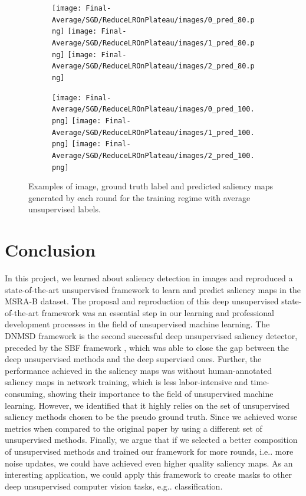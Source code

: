 \documentclass{article}
\makeatletter
\DeclareRobustCommand\onedot{\futurelet\@let@token\@onedot}
\def\@onedot{\ifx\@let@token.\else.\null\fi\xspace}
\def\eg{e.g\onedot} \def\Eg{E.g\onedot}
\def\ie{i.e\onedot} \def\Ie{I.e\onedot}
\makeatother
\begin{document}
\begin{figure}[h]
\begin{subfigure}[c]{0.12\textwidth}
  \end{subfigure}
  \begin{subfigure}[c]{0.12\textwidth}
    \centering
      \texttt{[image: Final-Average/SGD/ReduceLROnPlateau/images/0\_pred\_80.png]}
      \texttt{[image: Final-Average/SGD/ReduceLROnPlateau/images/1\_pred\_80.png]}
      \texttt{[image: Final-Average/SGD/ReduceLROnPlateau/images/2\_pred\_80.png]}
  \end{subfigure}
  \begin{subfigure}[c]{0.12\textwidth}
    \centering
      \texttt{[image: Final-Average/SGD/ReduceLROnPlateau/images/0\_pred\_100.png]}
      \texttt{[image: Final-Average/SGD/ReduceLROnPlateau/images/1\_pred\_100.png]}
      \texttt{[image: Final-Average/SGD/ReduceLROnPlateau/images/2\_pred\_100.png]}
  \end{subfigure}
  \caption{Examples of image, ground truth label and predicted saliency maps generated by each round for the training regime with average unsupervised labels.}
  \label{fig:av_ablation_sm}
\end{figure}

\section{Conclusion}

In this project, we learned about saliency detection in images and reproduced a state-of-the-art unsupervised framework to learn and predict saliency maps in the MSRA-B dataset. The proposal and reproduction of this deep unsupervised state-of-the-art framework was an essential step in our learning and professional development processes in the field of unsupervised machine learning. The DNMSD framework \cite{zhang2018} is the second successful deep unsupervised saliency detector, preceded by the SBF framework \cite{zhang2017}, which was able to close the gap between the deep unsupervised methods and the deep supervised ones. Further, the performance achieved in the saliency maps was without human-annotated saliency maps in network training, which is less labor-intensive and time-consuming, showing their importance to the field of unsupervised machine learning. However, we identified that it highly relies on the set of unsupervised saliency methods chosen to be the pseudo ground truth. Since we achieved worse metrics when compared to the original paper \cite{zhang2018} by using a different set of unsupervised methods. Finally, we argue that if we selected a better composition of unsupervised methods and trained our framework for more rounds, \ie more noise updates, we could have achieved even higher quality saliency maps. As an interesting application, we could apply this framework to create masks to other deep unsupervised computer vision tasks, \eg classification. 

\printbibliography
\end{document}
